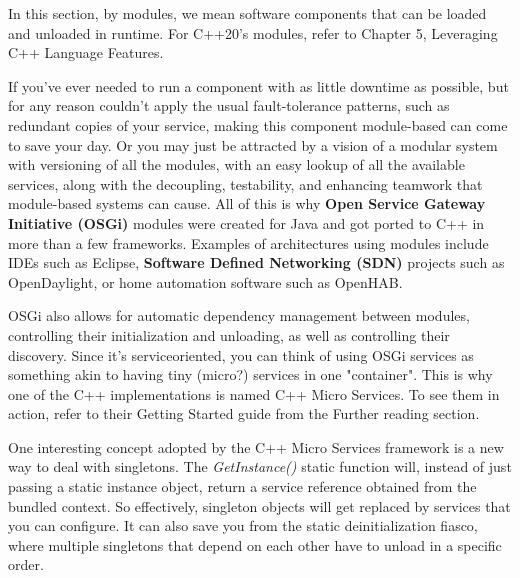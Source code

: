 \begin{tcolorbox}[colback=blue!5!white,colframe=blue!75!black, title=Note]
\hspace*{0.7cm}In this section, by modules, we mean software components that can be loaded and unloaded in runtime. For C++20's modules, refer to Chapter 5, Leveraging C++ Language Features.
\end{tcolorbox}

If you've ever needed to run a component with as little downtime as possible, but for any reason couldn't apply the usual fault-tolerance patterns, such as redundant copies of your service, making this component module-based can come to save your day. Or you may just be attracted by a vision of a modular system with versioning of all the modules, with an easy lookup of all the available services, along with the decoupling, testability, and enhancing teamwork that module-based systems can cause. All of this is why \textbf{Open Service Gateway Initiative (OSGi)} modules were created for Java and got ported to C++ in more than a few frameworks. Examples of architectures using modules include IDEs such as Eclipse, \textbf{Software Defined Networking (SDN)} projects such as OpenDaylight, or home automation software such as OpenHAB.

OSGi also allows for automatic dependency management between modules, controlling their initialization and unloading, as well as controlling their discovery. Since it's  serviceoriented, you can think of using OSGi services as something akin to having tiny (micro?) services in one "container". This is why one of the C++ implementations is named C++ Micro Services. To see them in action, refer to their Getting Started guide from the Further reading section.

One interesting concept adopted by the C++ Micro Services framework is a new way to deal with singletons. The \textit{GetInstance()} static function will, instead of just passing a static instance object, return a service reference obtained from the bundled context. So effectively, singleton objects will get replaced by services that you can configure. It can also save you from the static deinitialization fiasco, where multiple singletons that depend on each other have to unload in a specific order.





